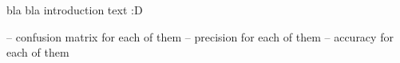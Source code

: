 bla bla introduction text :D


-- confusion matrix for each of them
-- precision for each of them
-- accuracy for each of them
